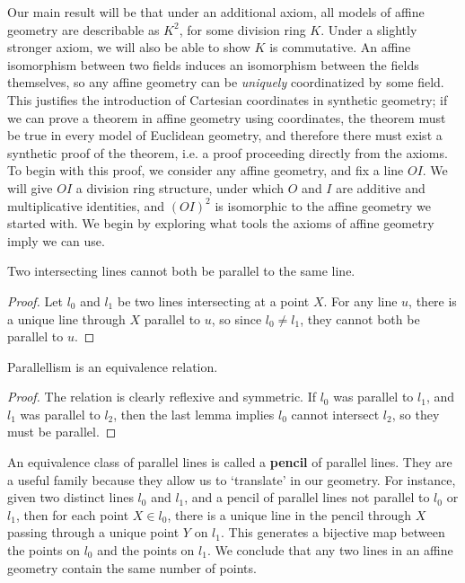 Our main result will be that under an additional axiom, all models of affine geometry are describable as $K^2$, for some division ring $K$. Under a slightly stronger axiom, we will also be able to show $K$ is commutative. An affine isomorphism between two fields induces an isomorphism between the fields themselves, so any affine geometry can be {\it uniquely} coordinatized by some field. This justifies the introduction of Cartesian coordinates in synthetic geometry; if we can prove a theorem in affine geometry using coordinates, the theorem must be true in every model of Euclidean geometry, and therefore there must exist a synthetic proof of the theorem, i.e. a proof proceeding directly from the axioms. To begin with this proof, we consider any affine geometry, and fix a line $OI$. We will give $OI$ a division ring structure, under which $O$ and $I$ are additive and multiplicative identities, and $(OI)^2$ is isomorphic to the affine geometry we started with. We begin by exploring what tools the axioms of affine geometry imply we can use.

\begin{lemma}
    Two intersecting lines cannot both be parallel to the same line.
\end{lemma}
\begin{proof}
    Let $l_0$ and $l_1$ be two lines intersecting at a point $X$. For any line $u$, there is a unique line through $X$ parallel to $u$, so since $l_0 \neq l_1$, they cannot both be parallel to $u$.
\end{proof}

\begin{corollary}
    Parallellism is an equivalence relation.
\end{corollary}
\begin{proof}
    The relation is clearly reflexive and symmetric. If $l_0$ was parallel to $l_1$, and $l_1$ was parallel to $l_2$, then the last lemma implies $l_0$ cannot intersect $l_2$, so they must be parallel.
\end{proof}

An equivalence class of parallel lines is called a {\bf pencil} of parallel lines. They are a useful family because they allow us to `translate' in our geometry. For instance, given two distinct lines $l_0$ and $l_1$, and a pencil of parallel lines not parallel to $l_0$ or $l_1$, then for each point $X \in l_0$, there is a unique line in the pencil through $X$ passing through a unique point $Y$ on $l_1$. This generates a bijective map between the points on $l_0$ and the points on $l_1$. We conclude that any two lines in an affine geometry contain the same number of points.

